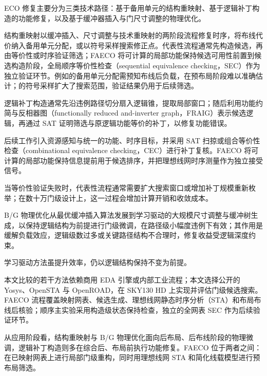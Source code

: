 \documentclass[twocolumn,10pt,fontset=windows]{ctexart}
\begin{document}
ECO 修复主要分为三类技术路径：基于备用单元的结构重映射、基于逻辑补丁构造的功能修复，以及基于缓冲器插入与门尺寸调整的物理优化。

结构重映射以缓冲插入、尺寸调整与技术重映射的两阶段流程修复时序，将布线代价纳入备用单元分配\cite{ho2010eco,ho2012treco}，或以符号采样搜索修正点\cite{kravets2019symbolic}。代表性流程通常先构造候选，再由等价性或时序验证筛选；FAECO 将可计算的局部功能保持候选可用性前置到候选构造阶段，全局顺序等价性检查（sequential equivalence checking，SEC）作为独立验证环节。例如\cite{ho2010eco}的备用单元分配需预知布线后负载，在预布局阶段难以准确估计；\cite{kravets2019symbolic}的符号采样扩大了搜索范围，验证结果仍用于后续筛选。

逻辑补丁构造通常先沿违例路径切分扇入逻辑锥，提取局部窗口；随后利用功能约简与反相器图（functionally reduced and-inverter graph，FRAIG）表示候选逻辑，再通过 SAT 证明筛选与原逻辑功能等价的补丁，以修复功能错误\cite{jiang2010fraig,jiang2016resource}。

后续工作引入资源感知\cite{jiang2016resource}与统一的功能、时序目标\cite{lin2011simult,luo2016unified}，并采用 SAT 扫掠或组合等价性检查（combinational equivalence checking，CEC）进行补丁复核\cite{mishchenko2006sat,zhong2024stp}。FAECO 将可计算的局部功能保持信息提前用于候选排序，并把理想线网时序测量作为独立接受信号。

当等价性验证失败时，代表性流程通常需要扩大搜索窗口或增加补丁规模重新枚举\cite{zhuo2018patch}；在数十万门级设计上，这一过程会增加计算开销和收敛成本。

B/G 物理优化从最优缓冲插入算法\cite{liang2012buffer}发展到学习驱动的大规模尺寸调整与缓冲树生成\cite{liu2021rlsizer,huang2025phys,chen2024aito,zhang2025buffalo}，以保持逻辑结构为前提进行门级微调，在路径级小幅度违例下有效；其作用是缓解负载效应，逻辑级数过多或关键路径结构不合理时，修复收益受逻辑深度约束\cite{liu2021rlsizer,huang2025phys}。

学习驱动方法\cite{chen2024aito,zhang2025buffalo}虽提升效率，仍以逻辑结构保持不变为前提。

本文比较的若干方法依赖商用 EDA 引擎或内部工业流程；本文选择公开的 Yosys\cite{yosys}、OpenSTA\cite{opensta} 与 OpenROAD\cite{openroad}，在 SKY130 HD\cite{sky130} 上实现并评估门级候选搜索。FAECO 流程覆盖映射网表、候选生成、理想线网静态时序分析（STA）和布局布线后核验；顺序主实验采用构造级状态保持检查，独立的全网表 SEC 作为后续验证环节。

从应用阶段看，结构重映射与 B/G 物理优化面向后布局、后布线阶段的物理微调，逻辑补丁构造则多在综合后、布局前执行功能修复。FAECO 位于两者之间：在已映射网表上进行局部门级重构，同时用理想线网 STA 和简化线载模型进行预布局筛选。
\end{document}
